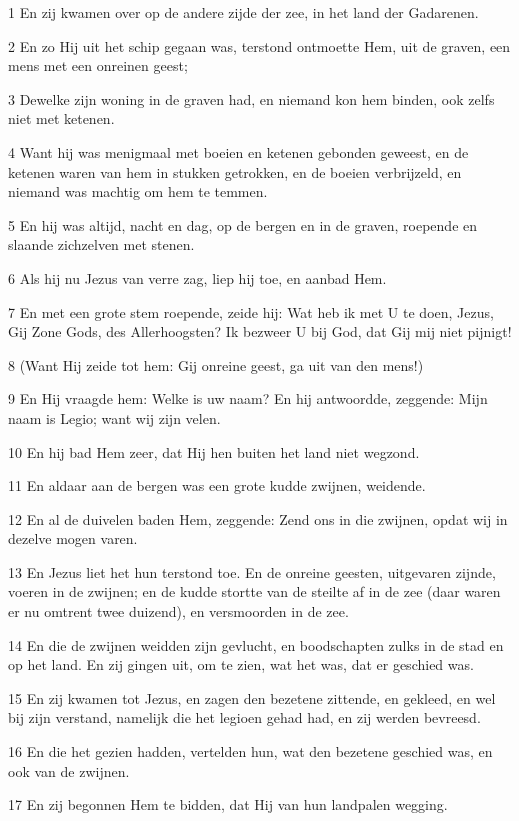 \par 1 En zij kwamen over op de andere zijde der zee, in het land der Gadarenen.
\par 2 En zo Hij uit het schip gegaan was, terstond ontmoette Hem, uit de graven, een mens met een onreinen geest;
\par 3 Dewelke zijn woning in de graven had, en niemand kon hem binden, ook zelfs niet met ketenen.
\par 4 Want hij was menigmaal met boeien en ketenen gebonden geweest, en de ketenen waren van hem in stukken getrokken, en de boeien verbrijzeld, en niemand was machtig om hem te temmen.
\par 5 En hij was altijd, nacht en dag, op de bergen en in de graven, roepende en slaande zichzelven met stenen.
\par 6 Als hij nu Jezus van verre zag, liep hij toe, en aanbad Hem.
\par 7 En met een grote stem roepende, zeide hij: Wat heb ik met U te doen, Jezus, Gij Zone Gods, des Allerhoogsten? Ik bezweer U bij God, dat Gij mij niet pijnigt!
\par 8 (Want Hij zeide tot hem: Gij onreine geest, ga uit van den mens!)
\par 9 En Hij vraagde hem: Welke is uw naam? En hij antwoordde, zeggende: Mijn naam is Legio; want wij zijn velen.
\par 10 En hij bad Hem zeer, dat Hij hen buiten het land niet wegzond.
\par 11 En aldaar aan de bergen was een grote kudde zwijnen, weidende.
\par 12 En al de duivelen baden Hem, zeggende: Zend ons in die zwijnen, opdat wij in dezelve mogen varen.
\par 13 En Jezus liet het hun terstond toe. En de onreine geesten, uitgevaren zijnde, voeren in de zwijnen; en de kudde stortte van de steilte af in de zee (daar waren er nu omtrent twee duizend), en versmoorden in de zee.
\par 14 En die de zwijnen weidden zijn gevlucht, en boodschapten zulks in de stad en op het land. En zij gingen uit, om te zien, wat het was, dat er geschied was.
\par 15 En zij kwamen tot Jezus, en zagen den bezetene zittende, en gekleed, en wel bij zijn verstand, namelijk die het legioen gehad had, en zij werden bevreesd.
\par 16 En die het gezien hadden, vertelden hun, wat den bezetene geschied was, en ook van de zwijnen.
\par 17 En zij begonnen Hem te bidden, dat Hij van hun landpalen wegging.
